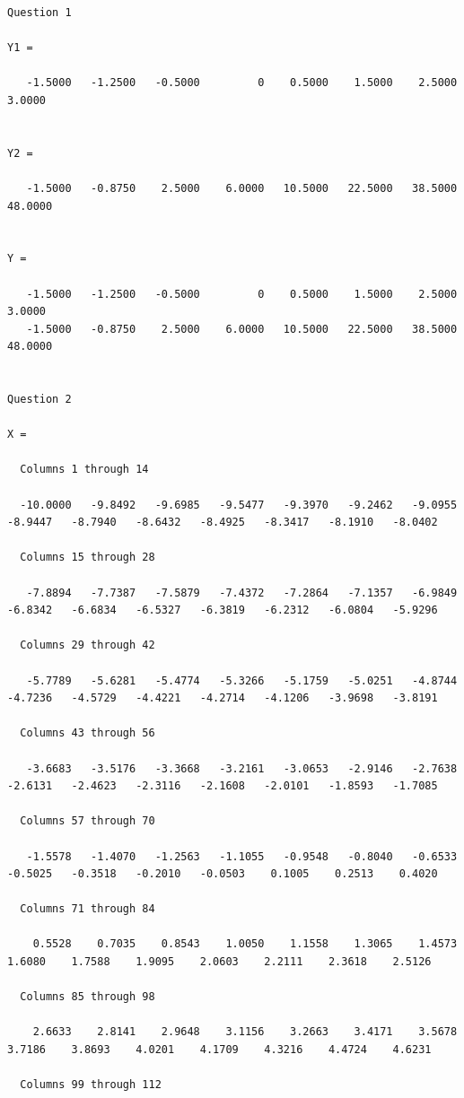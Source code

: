 \documentclass[12pt]{article}
\begin{document}
\fontsize{7.3pt}{3pt}\selectfont
\begin{verbatim}
Question 1

Y1 =

   -1.5000   -1.2500   -0.5000         0    0.5000    1.5000    2.5000    3.0000


Y2 =

   -1.5000   -0.8750    2.5000    6.0000   10.5000   22.5000   38.5000   48.0000


Y =

   -1.5000   -1.2500   -0.5000         0    0.5000    1.5000    2.5000    3.0000
   -1.5000   -0.8750    2.5000    6.0000   10.5000   22.5000   38.5000   48.0000


Question 2

X =

  Columns 1 through 14

  -10.0000   -9.8492   -9.6985   -9.5477   -9.3970   -9.2462   -9.0955   -8.9447   -8.7940   -8.6432   -8.4925   -8.3417   -8.1910   -8.0402

  Columns 15 through 28

   -7.8894   -7.7387   -7.5879   -7.4372   -7.2864   -7.1357   -6.9849   -6.8342   -6.6834   -6.5327   -6.3819   -6.2312   -6.0804   -5.9296

  Columns 29 through 42

   -5.7789   -5.6281   -5.4774   -5.3266   -5.1759   -5.0251   -4.8744   -4.7236   -4.5729   -4.4221   -4.2714   -4.1206   -3.9698   -3.8191

  Columns 43 through 56

   -3.6683   -3.5176   -3.3668   -3.2161   -3.0653   -2.9146   -2.7638   -2.6131   -2.4623   -2.3116   -2.1608   -2.0101   -1.8593   -1.7085

  Columns 57 through 70

   -1.5578   -1.4070   -1.2563   -1.1055   -0.9548   -0.8040   -0.6533   -0.5025   -0.3518   -0.2010   -0.0503    0.1005    0.2513    0.4020

  Columns 71 through 84

    0.5528    0.7035    0.8543    1.0050    1.1558    1.3065    1.4573    1.6080    1.7588    1.9095    2.0603    2.2111    2.3618    2.5126

  Columns 85 through 98

    2.6633    2.8141    2.9648    3.1156    3.2663    3.4171    3.5678    3.7186    3.8693    4.0201    4.1709    4.3216    4.4724    4.6231

  Columns 99 through 112


\end{verbatim}
\end{document}

